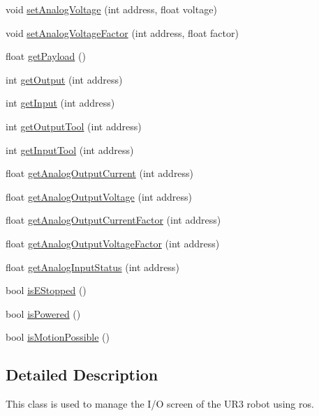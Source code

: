 \begin{DoxyCompactItemize}
void \hyperlink{classur__variables_a666aa5f8c1604edec18d550a7c3981cd}{set\+Analog\+Voltage} (int address, float voltage)
\item 
void \hyperlink{classur__variables_ac5c23484f351ae70a789e61c3e1a2050}{set\+Analog\+Voltage\+Factor} (int address, float factor)
\item 
float \hyperlink{classur__variables_a1c192fdbea31c9fb732fc04b2ceeda3c}{get\+Payload} ()
\item 
int \hyperlink{classur__variables_afc3a5168edfd41b2bcd29208eb9d1cf6}{get\+Output} (int address)
\item 
int \hyperlink{classur__variables_a09a51297fcbb792c47e6aaf1ab385e68}{get\+Input} (int address)
\item 
int \hyperlink{classur__variables_adbdc9a5059ebaa33a7cf396b50cfa43b}{get\+Output\+Tool} (int address)
\item 
int \hyperlink{classur__variables_a659a8dff99c4d05008b71d4895ebfd58}{get\+Input\+Tool} (int address)
\item 
float \hyperlink{classur__variables_a4a1d3df9175c2f3112b3196150cf396e}{get\+Analog\+Output\+Current} (int address)
\item 
float \hyperlink{classur__variables_a6cbcde159d8b46f483071456f925a883}{get\+Analog\+Output\+Voltage} (int address)
\item 
float \hyperlink{classur__variables_ae1b47fca8605e12f71ec22b878fd4edb}{get\+Analog\+Output\+Current\+Factor} (int address)
\item 
float \hyperlink{classur__variables_a113239a482e63757a896c0747087ba4e}{get\+Analog\+Output\+Voltage\+Factor} (int address)
\item 
float \hyperlink{classur__variables_af68eb2eac2a72110fd62031c4c54aeb9}{get\+Analog\+Input\+Status} (int address)
\item 
bool \hyperlink{classur__variables_ab1be203855aab79060d90934ca6cfaba}{is\+E\+Stopped} ()
\item 
bool \hyperlink{classur__variables_a97bc8a5d56f169ac146c2f140f80f0ba}{is\+Powered} ()
\item 
bool \hyperlink{classur__variables_a997830387a813d207240d97dce8bcb32}{is\+Motion\+Possible} ()
\end{DoxyCompactItemize}


\subsection{Detailed Description}
This class is used to manage the I/O screen of the U\+R3 robot using ros. 

